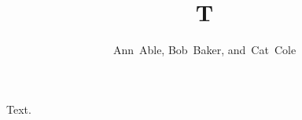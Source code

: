 \documentclass[journal]{IEEEtran}
\begin{document}
\title{T}
\author{Ann~Able, Bob~Baker, and~Cat~Cole}
\maketitle
Text.
\end{document}
